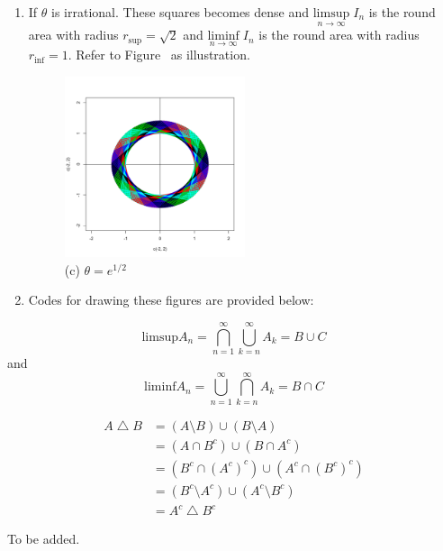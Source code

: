 \begin{list}{1.9.}{}
\begin{enumerate}
  \item If $\theta$ is irrational. These squares becomes dense and $ \underset{n\to\infty}{\mathrm{limsup}}\;I_n$ is the round area with radius $r_{\mathrm{sup}}= \sqrt{2}$ and $ \underset{n\to\infty}{\mathrm{liminf}}\;I_n$ is the round area with radius $r_{\mathrm{inf}} = 1$. Refer to Figure~ as illustration.
    \begin{figure}[htbp]
      \centering
      \includegraphics[width=0.5\textwidth]{./Figures/1_9_7_c.pdf}
      \caption{(c) $\theta = e^{1/2}$}
      \label{fig:1.9.7.c}
    \end{figure}
  \item Codes for drawing these figures are provided below:
    
  \end{enumerate}

  
\item
  \[
    \mathrm{limsup}A_n = \bigcap\limits_{n=1}^\infty\bigcup\limits_{k=n}^\infty A_k = B \cup C
  \]
  and
  \[
    \mathrm{liminf}A_n = \bigcup\limits_{n=1}^\infty\bigcap\limits_{k=n}^\infty A_k = B \cap C
  \]

  
\item
  \[
    \begin{aligned}
      A \bigtriangleup B &= \left(A \setminus B\right) \cup \left(B \setminus A\right)    \\
      & = \left(A \cap B^c \right) \cup \left(B \cap A^c \right)    \\
      & = \left(B^c \cap \left(A^c\right)^c \right) \cup \left(A^c \cap \left(B^c\right)^c \right)    \\
      & = \left(B^c \setminus A^c \right) \cup \left(A^c \setminus B^c \right)    \\
      & = A^c \bigtriangleup B^c
    \end{aligned}
  \]

  
\item To be added.
  
\end{list}

